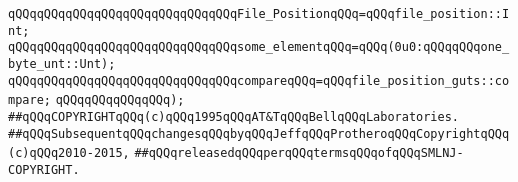 \newline
\verb|qQQqqQQqqQQqqQQqqQQqqQQqqQQqqQQqFile_PositionqQQq=qQQqfile_position::Int;|\newline
\newline
\verb|qQQqqQQqqQQqqQQqqQQqqQQqqQQqqQQqsome_elementqQQq=qQQq(0u0:qQQqqQQqone_byte_unt::Unt);|\newline
\newline
\verb|qQQqqQQqqQQqqQQqqQQqqQQqqQQqqQQqcompareqQQq=qQQqfile_position_guts::compare;|\newline
\verb|qQQqqQQqqQQqqQQq);|\newline
\newline
\newline
\newline
\newline
\verb|##qQQqCOPYRIGHTqQQq(c)qQQq1995qQQqAT&TqQQqBellqQQqLaboratories.|\newline
\verb|##qQQqSubsequentqQQqchangesqQQqbyqQQqJeffqQQqProtheroqQQqCopyrightqQQq(c)qQQq2010-2015,|\newline
\verb|##qQQqreleasedqQQqperqQQqtermsqQQqofqQQqSMLNJ-COPYRIGHT.|\newline

